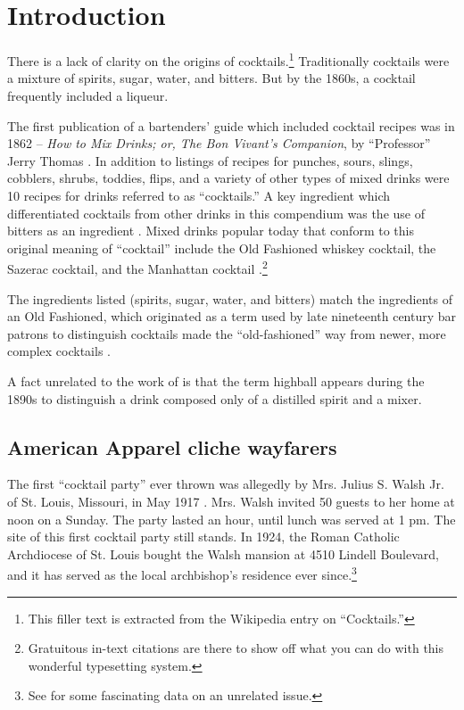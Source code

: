 \chapter{Introduction}\label{chapter:intro}

\noindent There is a lack of clarity on the origins of cocktails.\footnote{This filler text is extracted from the Wikipedia entry on ``Cocktails.''} Traditionally cocktails were a mixture of spirits, sugar, water, and bitters. But by the 1860s, a cocktail frequently included a liqueur.

The first publication of a bartenders' guide which included cocktail recipes was in 1862 -- \emph{How to Mix Drinks; or, The Bon Vivant's Companion}, by ``Professor'' Jerry Thomas \citep[99--111]{ViejoMyth}. In addition to listings of recipes for punches, sours, slings, cobblers, shrubs, toddies, flips, and a variety of other types of mixed drinks were 10 recipes for drinks referred to as ``cocktails.'' A key ingredient which differentiated cocktails from other drinks in this compendium was the use of bitters as an ingredient \citep{OrsiCrossing,VasquezKnottPlace,EconomistNew}. Mixed drinks popular today that conform to this original meaning of ``cocktail'' include the Old Fashioned whiskey cocktail, the Sazerac cocktail, and the Manhattan cocktail \citep{ShulevitzHiding,DavisPlanetNLR,KnoxNetworks,BenderEdge}.\footnote{Gratuitous in-text citations are there to show off what you can do with this wonderful typesetting system.}

The ingredients listed (spirits, sugar, water, and bitters) match the ingredients of an Old Fashioned, which originated as a term used by late nineteenth century bar patrons to distinguish cocktails made the ``old-fashioned'' way from newer, more complex cocktails \citep{MaussSeasonal,BoltanskiChiapello}.

A fact unrelated to the work of \citet{DuBoisPhiladelphia} is that the term highball appears during the 1890s to distinguish a drink composed only of a distilled spirit and a mixer.

\section{American Apparel cliche wayfarers}

The first ``cocktail party'' ever thrown was allegedly by Mrs. Julius S. Walsh Jr. of St. Louis, Missouri, in May 1917 \citep[but see][]{HobsbawmRanger}. Mrs. Walsh invited 50 guests to her home at noon on a Sunday. The party lasted an hour, until lunch was served at 1 pm. The site of this first cocktail party still stands. In 1924, the Roman Catholic Archdiocese of St. Louis bought the Walsh mansion at 4510 Lindell Boulevard, and it has served as the local archbishop's residence ever since.\footnote{See \citet{ArdaNational} for some fascinating data on an unrelated issue.}

